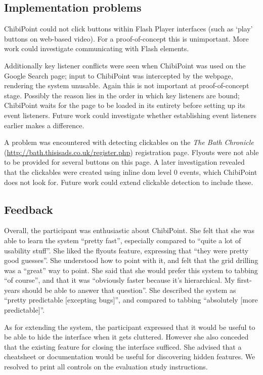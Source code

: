 \documentclass[a4paper, 12pt]{report}
\begin{document}
\subsection{Implementation problems}
ChibiPoint could not click buttons within Flash Player interfaces (such as `play' buttons on web-based video). For a proof-of-concept this is unimportant. More work could investigate communicating with Flash elements.

Additionally key listener conflicts were seen when ChibiPoint was used on the Google Search page; input to ChibiPoint was intercepted by the webpage, rendering the system unusable. Again this is not important at proof-of-concept stage. Possibly the reason lies in the order in which key listeners are bound; ChibiPoint waits for the page to be loaded in its entirety before setting up its event listeners. Future work could investigate whether establishing event listeners earlier makes a difference.

A problem was encountered with detecting clickables on the \textit{The Bath Chronicle} (\url{http://bath.thisisads.co.uk/register.php}) registration page. Flyouts were not able to be provided for several buttons on this page. A later investigation revealed that the clickables were created using inline \gls{dom} level 0 events, which ChibiPoint does not look for. Future work could extend clickable detection to include these.

\subsection{Feedback}
Overall, the participant was enthusiastic about ChibiPoint. She felt that she was able to learn the system ``pretty fast'', especially compared to ``quite a lot of usability stuff''. She liked the flyouts feature, expressing that ``they were pretty good guesses''. She understood how to point with it, and felt that the grid drilling was a ``great'' way to point. She said that she would prefer this system to tabbing ``of course'', and that it was ``obviously faster because it's hierarchical. My first-years should be able to answer that question''. She described the system as ``pretty predictable [excepting bugs]'', and compared to tabbing ``absolutely [more predictable]''.

As for extending the system, the participant expressed that it would be useful to be able to hide the interface when it gets cluttered. However she also conceded that the existing feature for closing the interface sufficed. She advised that a cheatsheet or documentation would be useful for discovering hidden features. We resolved to print all controls on the evaluation study instructions.
\end{document}
